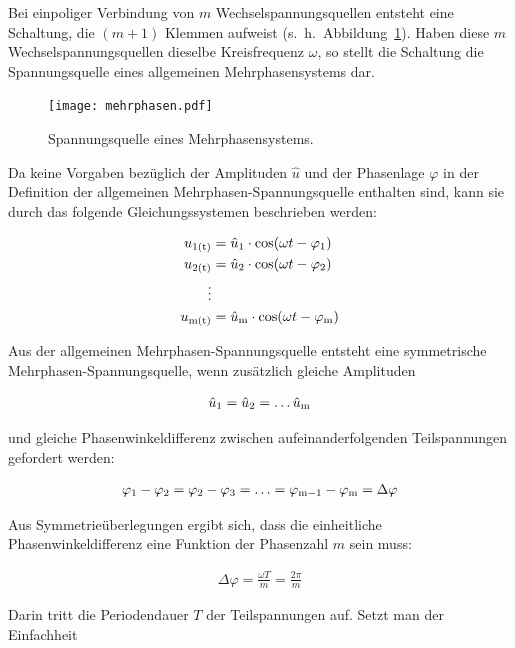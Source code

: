 Bei einpoliger Verbindung von $m$ Wechselspannungsquellen entsteht eine Schaltung, die $(m+1)$ Klemmen aufweist (s.~h.~Abbildung~\ref{fig:mehrphasen}).
Haben diese $m$ Wechselspannungsquellen dieselbe Kreisfrequenz $\omega$, so stellt die Schaltung die Spannungsquelle eines allgemeinen Mehrphasensystems dar.

\begin{figure}[!h]
\centering
\texttt{[image: mehrphasen.pdf]}
\label{fig:mehrphasen}
\caption{Spannungsquelle eines Mehrphasensystems.}
\end{figure}

Da keine Vorgaben bezüglich der Amplituden $\hat{u}$ und der Phasenlage $\varphi$ in der Definition der allgemeinen Mehrphasen-Spannungsquelle enthalten sind, kann sie \zB durch das folgende Gleichungssystemen beschrieben werden:

\begin{align}
u_{\mathrm{1(t)}} &= \hat{u}_{\mathrm{1}} \cdot \cos(\omega t - \varphi_{\mathrm{1}}) \\
u_{\mathrm{2(t)}} &= \hat{u}_{\mathrm{2}} \cdot \cos(\omega t - \varphi_{\mathrm{2}}) \nonumber  \\
\vdots \nonumber \\
u_{\mathrm{m(t)}} &= \hat{u}_{\mathrm{m}} \cdot \cos(\omega t - \varphi_{\mathrm{m}}) \nonumber
\end{align}

Aus der allgemeinen Mehrphasen-Spannungsquelle entsteht eine symmetrische Mehrphasen-Spannungsquelle, wenn zusätzlich gleiche Amplituden

\begin{align*}
\hat{u}_{\mathrm{1}} = \hat{u}_{\mathrm{2}} = \ldots \hat{u}_{\mathrm{m}}
\end{align*}

und gleiche Phasenwinkeldifferenz zwischen aufeinanderfolgenden Teilspannungen gefordert werden:

\begin{align*}
\varphi_{\mathrm{1}} - \varphi_{\mathrm{2}} = \varphi_{\mathrm{2}} - \varphi_{\mathrm{3}} = \ldots = \varphi_{\mathrm{m-1}} - \varphi_{\mathrm{m}} = \Delta \varphi
\end{align*}

Aus Symmetrieüberlegungen ergibt sich, dass die einheitliche Phasenwinkeldifferenz eine Funktion der Phasenzahl $m$ sein muss:

\begin{align}
\Delta \varphi = \frac{\omega T}{m} = \frac{2\pi}{m}
\end{align}

Darin tritt die Periodendauer $T$ der Teilspannungen auf.
Setzt man der Einfachheit

